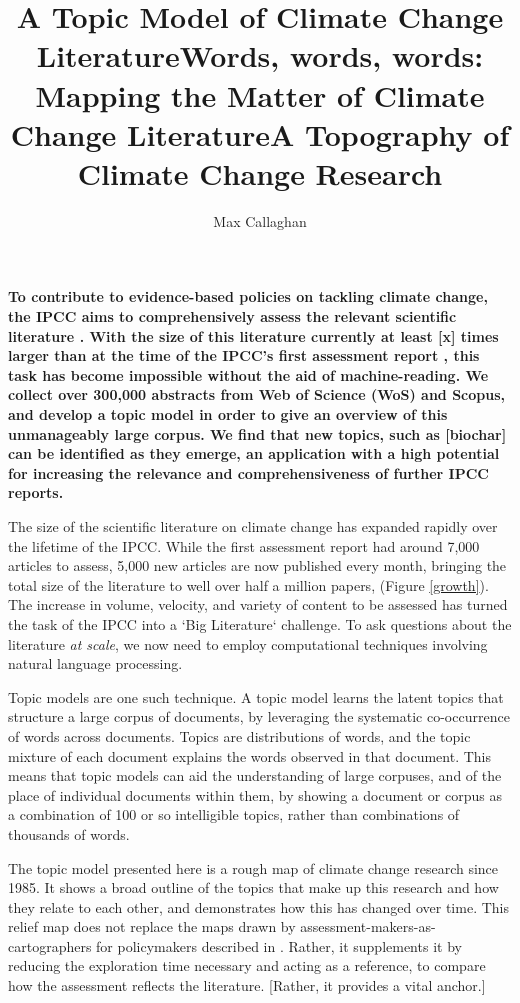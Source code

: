 \documentclass{article}
\title{A Topic Model of Climate Change Literature}
\title{Words, words, words: Mapping the Matter of Climate Change Literature}
\title{A Topography of Climate Change Research}
\author{Max Callaghan}
\begin{document}
\maketitle
\textbf{
To contribute to evidence-based policies on tackling climate change, the IPCC aims to comprehensively assess the relevant scientific literature \citep{IPCC2013}. With the size of this literature currently at least [x] times larger than at the time of the IPCC's first assessment report \citep{Houghton1990ClimateAssessment}, this task has become impossible without the aid of machine-reading. We collect over 300,000 abstracts from Web of Science (WoS) and Scopus, and develop a topic model in order to give an overview of this unmanageably large corpus. We find that new topics, such as [biochar] can be identified as they emerge, an application with a high potential for increasing the relevance and comprehensiveness of further IPCC reports.
}

The size of the scientific literature on climate change has expanded rapidly over the lifetime of the IPCC. While the first assessment report had around 7,000 articles to assess, 5,000 new articles are now published every month, bringing the total size of the literature to well over half a million papers, (Figure \ref{growth}). The increase in volume, velocity, and variety of content to be assessed has turned the task of the IPCC into a `Big Literature` challenge. To ask questions about the literature \textit{at scale}, we now need to employ computational techniques involving natural language processing.

Topic models are one such technique. A topic model learns the latent topics that structure a large corpus of documents, by leveraging the systematic co-occurrence of words across documents. Topics are distributions of words, and the topic mixture of each document explains the words observed in that document. This means that topic models can aid the understanding of large corpuses, and of the place of individual documents within them, by showing a document or corpus as a combination of 100 or so intelligible topics, rather than combinations of thousands of words.

The topic model presented here is a rough map of climate change research since 1985. It shows a broad outline of the topics that make up this research and how they relate to each other, and demonstrates how this has changed over time. This relief map does not replace the maps drawn by assessment-makers-as-cartographers for policymakers described in \citet{Edenhofer2015}. Rather, it supplements it by reducing the exploration time necessary and acting as a reference, to compare how the assessment reflects the literature. [Rather, it provides a vital anchor.]
\end{document}
